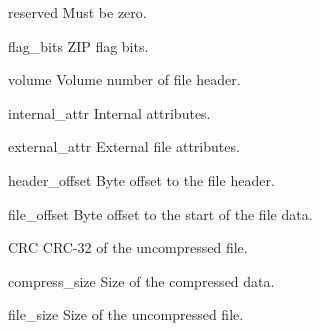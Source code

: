 \begin{memberdesc}[ZipInfo]{reserved}
  Must be zero.
\end{memberdesc}

\begin{memberdesc}[ZipInfo]{flag_bits}
  ZIP flag bits.
\end{memberdesc}

\begin{memberdesc}[ZipInfo]{volume}
  Volume number of file header.
\end{memberdesc}

\begin{memberdesc}[ZipInfo]{internal_attr}
  Internal attributes.
\end{memberdesc}

\begin{memberdesc}[ZipInfo]{external_attr}
 External file attributes.
\end{memberdesc}

\begin{memberdesc}[ZipInfo]{header_offset}
  Byte offset to the file header.
\end{memberdesc}

\begin{memberdesc}[ZipInfo]{file_offset}
  Byte offset to the start of the file data.
\end{memberdesc}

\begin{memberdesc}[ZipInfo]{CRC}
  CRC-32 of the uncompressed file.
\end{memberdesc}

\begin{memberdesc}[ZipInfo]{compress_size}
  Size of the compressed data.
\end{memberdesc}

\begin{memberdesc}[ZipInfo]{file_size}
  Size of the uncompressed file.
\end{memberdesc}
